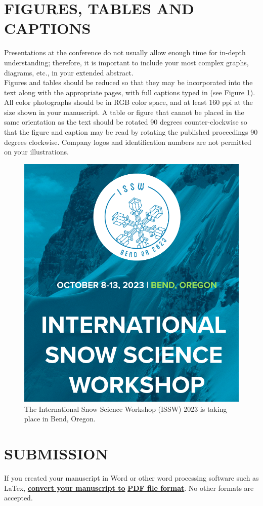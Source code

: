\documentclass[3p,authoryear,times,twocolumn]{elsarticle_issw2018}
\begin{document}
\section{FIGURES, TABLES AND CAPTIONS}
Presentations at the conference do not usually allow enough time for in-depth understanding; therefore, it is important to include your most complex graphs, diagrams, etc., in your extended abstract.\\
%
\noindent
Figures and tables should be reduced so that they may be incorporated into the text along with the appropriate pages, with full captions typed in (see Figure \ref{fig.issw_logo}).\\
\noindent
All color photographs should be in RGB color space, and at least 160 ppi at the size shown in your manuscript. A table or figure that cannot be placed in the same orientation as the text should be rotated 90 degrees counter-clockwise so that the figure and caption may be read by rotating the published proceedings 90 degrees clockwise. Company logos and identification numbers are not permitted on your illustrations.
\begin{figure}[ht]
 \centering
 \includegraphics[width=0.75\columnwidth]{./issw_logo}
 \caption{The International Snow Science Workshop (ISSW) 2023 is taking place in Bend, Oregon.}
 \label{fig.issw_logo}
\end{figure}
\section{SUBMISSION}
If you created your manuscript in Word or other word processing software such as LaTex, \textbf{\underline{convert your manuscript to}} \textbf{\underline{PDF file format}}. No other formats are accepted.\\
\end{document}
